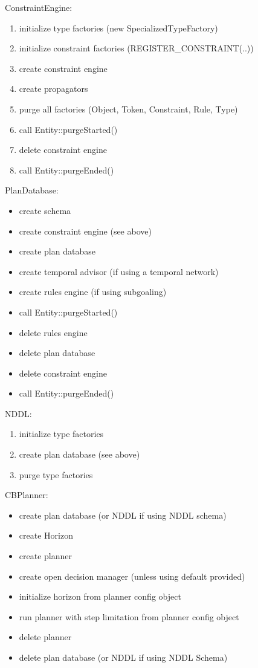 \documentclass[10pt, letterpaper, twoside]{article}
\begin{document}
ConstraintEngine:
\begin{enumerate}
 \item initialize type factories (new SpecializedTypeFactory)
 \item initialize constraint factories (REGISTER\_CONSTRAINT(..))
 \item create constraint engine
 \item create propagators
 \item purge all factories (Object, Token, Constraint, Rule, Type)
 \item call Entity::purgeStarted()
 \item delete constraint engine
 \item call Entity::purgeEnded()
\end{enumerate}

PlanDatabase:
\begin{itemize}
 \item create schema 
 \item create constraint engine (see above)
 \item create plan database
 \item create temporal advisor (if using a temporal network)
 \item create rules engine (if using subgoaling)
 \item call Entity::purgeStarted()
 \item delete rules engine
 \item delete plan database
 \item delete constraint engine 
 \item call Entity::purgeEnded()
\end{itemize}

NDDL:
\begin{enumerate}
 \item initialize type factories
 \item create plan database (see above)
 \item purge type factories
\end{enumerate}

CBPlanner:
\begin{itemize}
 \item create plan database (or NDDL if using NDDL schema)
 \item create Horizon
 \item create planner
 \item create open decision manager (unless using default provided)
 \item initialize horizon from planner config object
 \item run planner with step limitation from planner config object
 \item delete planner
 \item delete plan database (or NDDL if using NDDL Schema)
\end{itemize}
\end{document}
